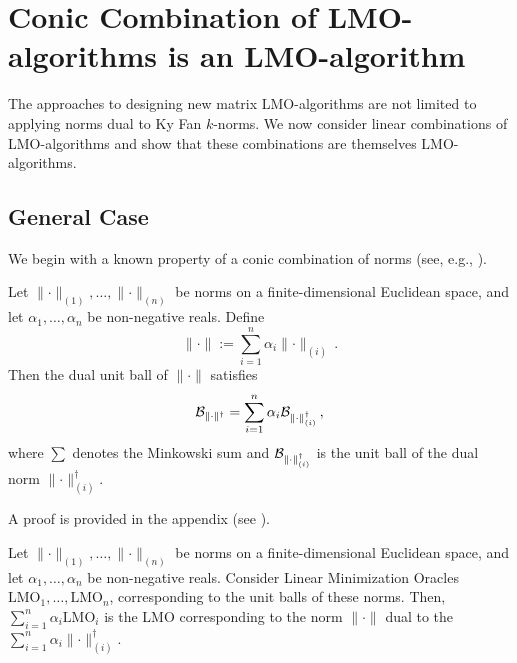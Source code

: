 \documentclass[pmlr]{jmlr}%
\newcommand{\norm}[1]{\lVert #1\rVert}
\begin{document}
 \section{Conic Combination of LMO-algorithms is an LMO-algorithm}
 \label{sec:conic_combo}
 
 The approaches to designing new matrix LMO-algorithms are not limited to applying norms dual to Ky Fan $k$-norms. We now consider linear combinations of LMO-algorithms and show that these combinations are themselves LMO-algorithms.
 
 \subsection{General Case}
 We begin with a known property of a conic combination of norms (see, e.g., \citep[Table 1]{yu2012arithmetic}).
 
 \begin{lemma}\label{lemma:dual_to_conv_comb}
   Let $\norm{\cdot}_{(1)},\dots,\norm{\cdot}_{(n)}$ be norms on a finite-dimensional Euclidean space, and let $\alpha_1,\dots,\alpha_n$ be non-negative reals. Define
   \[
     \norm{\cdot} := \sum_{i = 1}^n \alpha_i \norm{\cdot}_{(i)}\,.
   \]
   Then the dual unit ball of $\norm{\cdot}$ satisfies
   \[
     \cB_{\norm{\cdot}^\dagger}
     = \sum_{i = 1}^n \alpha_i \cB_{\norm{\cdot}_{(i)}^\dagger}\,,
   \]
   where $\sum$ denotes the Minkowski sum and $\cB_{\norm{\cdot}_{(i)}^\dagger}$ is the unit ball of the dual norm $\norm{\cdot}_{(i)}^\dagger$.
 \end{lemma}
 
 A proof is provided in the appendix (see ).
 
 \begin{lemma}\label{lemma:lin_comb_lmo}
   Let $\norm{\cdot}_{(1)}, \dots, \norm{\cdot}_{(n)}$ be norms on a finite-dimensional Euclidean space, and let $\alpha_1, \dots, \alpha_n$ be non-negative reals. Consider Linear Minimization Oracles $\mathrm{LMO}_{1}, \dots, \mathrm{LMO}_{n}$, corresponding to the unit balls of these norms. Then, $\sum_{i = 1}^n \alpha_i \mathrm{LMO}_{i}$ is the LMO corresponding to the norm $\norm{\cdot}$ dual to the $\sum_{i = 1}^n \alpha_i \norm{\cdot}_{(i)}^\dagger$.
 \end{lemma}
 
\end{document}
